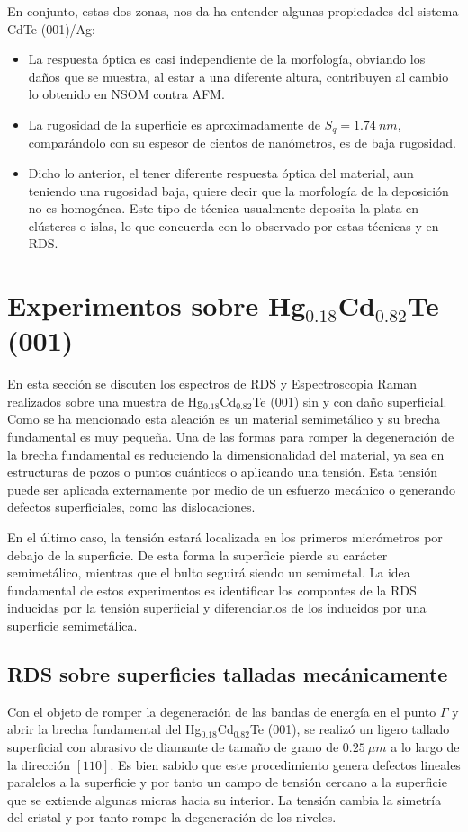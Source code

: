 En conjunto, estas dos zonas, nos da ha entender algunas propiedades del sistema CdTe (001)/Ag:
\begin{itemize}
    \item La respuesta óptica es casi independiente de la morfología, obviando los daños que se muestra, al estar a una diferente altura, contribuyen al cambio lo obtenido en NSOM contra AFM.
    \item La rugosidad de la superficie es aproximadamente de $S_{q} = 1.74\ nm$, comparándolo con su espesor de cientos de nanómetros, es de baja rugosidad.
    \item Dicho lo anterior, el tener diferente respuesta óptica del material, aun teniendo una rugosidad baja, quiere decir que la morfología de la deposición no es homogénea. Este tipo de técnica usualmente deposita la plata en clústeres o islas, lo que concuerda con lo observado por estas técnicas y en RDS. 
 \end{itemize}
\newpage

\section{Experimentos sobre Hg$_{0.18}$Cd$_{0.82}$Te (001)}
\label{sec:chap4-hgcdte}
En esta sección se discuten los espectros de RDS y Espectroscopia Raman realizados sobre una muestra de Hg$_{0.18}$Cd$_{0.82}$Te (001) sin y con daño superficial. Como se ha mencionado esta aleación es un material semimetálico y su brecha fundamental es muy pequeña. Una de las formas para romper la degeneración de la brecha fundamental es reduciendo la dimensionalidad del material, ya sea en estructuras de pozos o puntos cuánticos o aplicando una tensión. Esta tensión puede ser aplicada externamente por medio de un esfuerzo mecánico o generando defectos superficiales, como las dislocaciones.

En el último caso, la tensión estará localizada en los primeros micrómetros por debajo de la superficie. De esta forma la superficie pierde su carácter semimetálico, mientras que el bulto seguirá siendo un semimetal. La idea fundamental de estos experimentos es identificar los compontes de la RDS inducidas por la tensión superficial y diferenciarlos de los inducidos por una superficie semimetálica.

\subsection{RDS sobre superficies talladas mecánicamente}
\label{sec:chap4-hgcdte-rds}
Con el objeto de romper la degeneración de las bandas de energía en el punto $\Gamma$ y abrir la brecha fundamental del Hg$_{0.18}$Cd$_{0.82}$Te (001), se realizó un ligero tallado superficial con abrasivo de diamante de tamaño de grano de $ 0.25\ \mu m $ a lo largo de la dirección $ [110] $. Es bien sabido que este procedimiento genera defectos lineales paralelos a la superficie y por tanto un campo de tensión cercano a la superficie que se extiende algunas micras hacia su interior\cite{LastrasMartnez1996}. La tensión cambia la simetría del cristal y por tanto rompe la degeneración de los niveles. 

